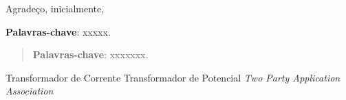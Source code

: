 \hspace{5mm}
Agradeço, inicialmente, 

\begin{resumo}



{\hspace{-8mm} \bf{Palavras-chave}}: xxxxx.

\acresetall

\end{resumo}

\begin{abstract}


{\hspace{-8mm} \bf{Palavras-chave}}: xxxxxxx.


\acresetall

\end{abstract}

\cleardoublepage
\listoffigures
\label{listadefiguras}
\acresetall

\cleardoublepage
\label{listadetabelas}
\listoftables
\cleardoublepage
\acresetall

\cleardoublepage
{} %
\begin{acronym}[MCAA]

  {Transformador de Corrente}
  {Transformador de Potencial}
  {\textit{Two Party Application Association}}
\end{acronym}

\pagestyle{ruledheader}
\tableofcontents
\acresetall

